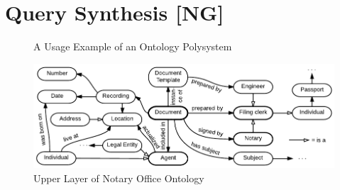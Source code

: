 \documentclass[conference]{IEEEtran}
\begin{document}
\section{Query Synthesis [NG]}
\label{sec:query-synthesis-ng}


\begin{figure}
\centering\footnotesize\sf
\def\svgwidth{0.9\linewidth}

\caption{A Usage Example of an Ontology Polysystem}
\label{OPSA}
\end{figure}

\begin{figure}[!t]
\centering
\includegraphics[width=\linewidth]{DocumentOntology-en.pdf}
\caption{Upper Layer of Notary Office Ontology}
\label{notaryontology}
\end{figure}


\end{document}
